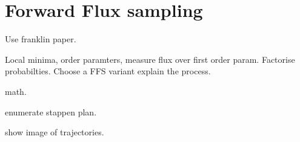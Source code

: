 \section{Forward Flux sampling}

Use franklin paper.

Local minima, order paramters, measure flux over first order param. Factorise
probabilties. Choose a FFS variant explain the process.

math.

enumerate stappen plan.

show image of trajectories.
